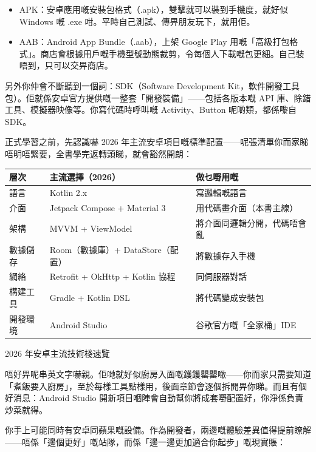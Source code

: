 \begin{itemize}
  \item APK：安卓應用嘅安裝包格式（.apk），雙擊就可以裝到手機度，就好似 Windows 嘅 .exe 咁。平時自己測試、傳畀朋友玩下，就用佢。
  \item AAB：Android App Bundle（.aab），上架 Google Play 用嘅「高級打包格式」。商店會根據用戶嘅手機型號動態裁剪，令每個人下載嘅包更細。自己裝唔到，只可以交畀商店。
\end{itemize}

另外你仲會不斷聽到一個詞：SDK（Software Development Kit，軟件開發工具包）。佢就係安卓官方提供嘅一整套「開發裝備」——包括各版本嘅 API 庫、除錯工具、模擬器映像等。你寫代碼時呼叫嘅 Activity、Button 呢啲類，都係嚟自 SDK。


正式學習之前，先認識嚇 2026 年主流安卓項目嘅標準配置——呢張清單你而家睇唔明唔緊要，全書學完返轉頭睇，就會豁然開朗：

\begin{center}
\begin{tabularx}{\linewidth}{|X|X|X|}
\hline
\textbf{層次} & \textbf{主流選擇（2026）} & \textbf{做乜嘢用嘅} \tabularnewline
\hline
語言 & Kotlin 2.x & 寫邏輯嘅語言 \tabularnewline
介面 & Jetpack Compose + Material 3 & 用代碼畫介面（本書主線） \tabularnewline
架構 & MVVM + ViewModel & 將介面同邏輯分開，代碼唔會亂 \tabularnewline
數據儲存 & Room（數據庫）+ DataStore（配置） & 將數據存入手機 \tabularnewline
網絡 & Retrofit + OkHttp + Kotlin 協程 & 同伺服器對話 \tabularnewline
構建工具 & Gradle + Kotlin DSL & 將代碼變成安裝包 \tabularnewline
開發環境 & Android Studio & 谷歌官方嘅「全家桶」IDE \tabularnewline
\hline
\end{tabularx}
\end{center}

\begin{center}\small\color{gray}2026 年安卓主流技術棧速覽\end{center}

唔好畀呢串英文字嚇親。佢哋就好似廚房入面嘅鑊鑊罌罌噉——你而家只需要知道「煮飯要入廚房」，至於每樣工具點樣用，後面章節會逐個拆開畀你睇。而且有個好消息：Android Studio 開新項目嗰陣會自動幫你將成套嘢配置好，你淨係負責炒菜就得。


你手上可能同時有安卓同蘋果嘅設備。作為開發者，兩邊嘅體驗差異值得提前瞭解——唔係「邊個更好」嘅站隊，而係「邊一邊更加適合你起步」嘅現實賬：

